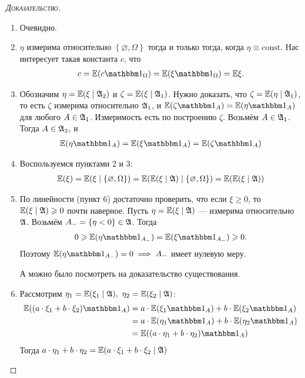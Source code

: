 \documentclass[../main.tex]{subfiles}
\begin{document}
\begin{proof}[\normalfont\textsc{Доказательство}]\
 \begin{enumerate}
  \item Очевидно.
  \item $ \eta $ измерима относительно $ \left\{ \varnothing, \Omega \right\} $ тогда и только тогда, когда $ \eta \equiv \mathrm{const} $. Нас интересует такая константа $ c $, что
   \begin{align*}
    c = \E(c \Ind_\Omega) = \E(\xi \Ind_\Omega) = \E\xi.
   \end{align*}
  \item Обозначим $ \eta = \mathbb E(\xi \mid \mathfrak A_2) $ и $ \zeta = \mathbb E(\xi \mid \mathfrak A_1) $. Нужно доказать, что $ \zeta = \mathbb E(\eta \mid \mathfrak A_1) $, то есть $ \zeta $ измерима относительно $ \mathfrak A_1 $, и $ \E(\zeta\Ind_A) = \E(\eta\Ind_A) $ для любого $ A \in \mathfrak A_1 $. Измеримость есть по построению $ \zeta $. Возьмём $ A \in \mathfrak A_1 $. Тогда $ A \in \mathfrak A_2 $, и
   \begin{align*}
    \E(\eta \Ind_A) = \E(\xi\Ind_A) = \E(\zeta \Ind_A)
   \end{align*}

\item Воспользуемся пунктами 2 и 3:
	\begin{align*}
		\mathbb E(\xi) = \mathbb E(\xi \mid \{\varnothing, \Omega\}) = \mathbb E(\mathbb E(\xi \mid \mathfrak A) \mid \{\varnothing, \Omega\}) = \mathbb E(\mathbb E(\xi \mid \mathfrak A))
	\end{align*}
  \item По линейности (пункт 6) достаточно проверить, что если $ \xi \geqslant 0 $, то $ \mathbb E(\xi \mid \mathfrak A) \geqslant 0 $ почти наверное. Пусть $ \eta = \mathbb E(\xi \mid \mathfrak A) $ --- измерима относительно $ \mathfrak A $. Возьмём $ A_- = \left\{ \eta < 0 \right\} \in \mathfrak A $. Тогда 
   \begin{align*}
    0\geqslant \E(\eta \Ind_{A_-}) = \E(\xi\Ind_{A_-}) \geqslant 0.
   \end{align*} Поэтому $ \E(\eta \Ind_{A_-}) = 0 \implies A_- $ имеет нулевую меру.

   А можно было посмотреть на доказательство существования.
 \item Рассмотрим $\eta_1 = \mathbb E(\xi_1 \mid \mathfrak A), \ \eta_2 = \mathbb E(\xi_2 \mid \mathfrak A)$: 
	 \begin{align*}
		 \E((a \cdot \xi_1 + b \cdot \xi_2) \Ind_A) &= a \cdot \E(\xi_1 \Ind_A) + b \cdot \E(\xi_2 \Ind_A) \\
																								&= a \cdot \E(\eta_1 \Ind_A) + b \cdot \E(\eta_2 \Ind_A) \\
																								&= \E((a \cdot \eta_1 + b \cdot \eta_2) \Ind_A)
	 \end{align*}
		Тогда $a \cdot \eta_1 + b \cdot \eta_2 = \mathbb E(a \cdot \xi_1 + b \cdot \xi_2 \mid \mathfrak A)$ 
 \end{enumerate}
\end{proof}
\end{document}
